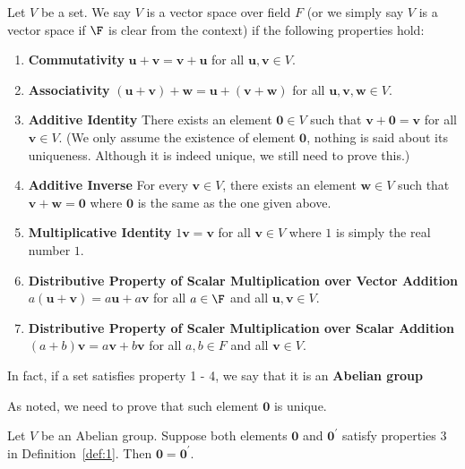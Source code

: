 \documentclass[thmcnt=section, color=cyan, 12pt]{my-elegantbook}
\begin{document}
\begin{definition} \label{def:1}
	Let $V$ be a set.
	We say $V$ is a vector space over field $F$
	(or we simply say $V$ is a vector space if $\F$ is clear from the context)
	if
	the following properties hold:
	\begin{enumerate}
		\item \textbf{Commutativity} $\mathbf{u} + \mathbf{v} = \mathbf{v} + \mathbf{u}$
		      for all $\mathbf{u}, \mathbf{v} \in V $.
		\item \textbf{Associativity} $(\mathbf{u}+\mathbf{v})+\mathbf{w} = \mathbf{u}+(\mathbf{v}+\mathbf{w})$ for all $\mathbf{u}, \mathbf{v}, \mathbf{w} \in V$.
		\item \textbf{Additive Identity} There exists an element $\mathbf{0} \in V$
		      such that $\mathbf{v} + \mathbf{0} = \mathbf{v}$ for all $\mathbf{v} \in V$.
		      (We only assume the existence of element $\mathbf{0}$,
		      nothing is said about its uniqueness.
		      Although it is indeed unique, we still need to prove this.)
		\item \textbf{Additive Inverse} For every $\mathbf{v} \in V$,
		      there exists an element $\mathbf{w} \in V$ such that $\mathbf{v} + \mathbf{w} = \mathbf{0}$ where $\mathbf{0}$ is the same as the one given above.
		\item \textbf{Multiplicative Identity} $1 \mathbf{v} = \mathbf{v}$ for all $\mathbf{v} \in V$ where $1$ is simply the real number $1$.
		\item \textbf{Distributive Property of Scalar Multiplication over Vector Addition} $a(\mathbf{u} + \mathbf{v}) = a\mathbf{u} + a\mathbf{v}$
		      for all $a \in \F$ and all $\mathbf{u}, \mathbf{v} \in V$.
		\item \textbf{Distributive Property of Scaler Multiplication over Scalar Addition} $(a+b) \mathbf{v} = a\mathbf{v} + b\mathbf{v}$ for all $a, b \in F$ and all $\mathbf{v} \in V$.
	\end{enumerate}
\end{definition}

\begin{note}
	In fact, if a set satisfies property 1 - 4, we say that it is
	an \textbf{Abelian group}
\end{note}

As noted, we need to prove that such element $\mathbf{0}$ is unique.

\begin{proposition}
	Let $V$ be an Abelian group. Suppose both elements $\mathbf{0}$ and $\mathbf{0}^\prime$
	satisfy properties 3 in Definition~\ref{def:1}.
	Then $\mathbf{0} = \mathbf{0}^\prime$.
\end{proposition}
\end{document}
